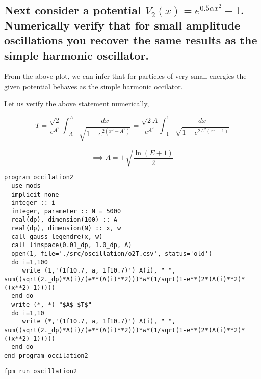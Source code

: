 \documentclass[a4paper,11pt,twoside]{article}
\begin{document}
\subsection{Next consider a potential \(V_2(x) = e^{0.5αx^2 } -1\). Numerically verify that for small amplitude oscillations you recover the same results as the simple harmonic oscillator.}
\label{sec:orgbea0e7d}

\begin{center}
\end{center}

From the above plot, we can infer that for particles of very small energies the given potential behaves as the simple harmonic occilator.

Let us verify the above statement numerically,

$$
T =\frac{\sqrt2}{e^{A^2}} \int _{-A}^{A} \frac{dx}{\sqrt{1-e^{2(x^2-A^2)}}} = \frac{\sqrt2A}{e^{A^2}} \int _{-1}^{1} \frac{dx}{\sqrt{1-e^{2A^2(x^2-1)}}}
$$

$$
\implies A = \pm \sqrt{\frac{\ln{(E+1)}}{2}}
$$

\clearpage

\begin{verbatim}
program occilation2
  use mods
  implicit none
  integer :: i
  integer, parameter :: N = 5000
  real(dp), dimension(100) :: A
  real(dp), dimension(N) :: x, w
  call gauss_legendre(x, w)
  call linspace(0.01_dp, 1.0_dp, A)
  open(1, file='./src/oscillation/o2T.csv', status='old')
  do i=1,100
     write (1,'(1f10.7, a, 1f10.7)') A(i), " ", sum((sqrt(2._dp)*A(i)/(e**(A(i)**2)))*w*(1/sqrt(1-e**(2*(A(i)**2)*((x**2)-1)))))
  end do
  write (*, *) "$A$ $T$"
  do i=1,10
     write (*,'(1f10.7, a, 1f10.7)') A(i), " ", sum((sqrt(2._dp)*A(i)/(e**(A(i)**2)))*w*(1/sqrt(1-e**(2*(A(i)**2)*((x**2)-1)))))
  end do
end program occilation2
\end{verbatim}


\begin{verbatim}
fpm run oscillation2
\end{verbatim}
\end{document}
